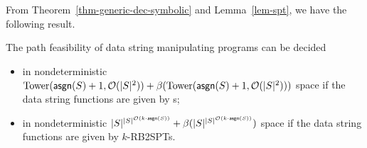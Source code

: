 From Theorem~\ref{thm-generic-dec-symbolic} and Lemma~\ref{lem-spt}, we have the following result.
\begin{theorem}\label{thm-spt}
The path feasibility of data string manipulating programs can be decided 

\begin{itemize}
	\item in nondeterministic $\mathrm{Tower}(\mathsf{asgn}(S)+1, \mathcal{O}(|S|^2)) + \beta(\mathrm{Tower}(\mathsf{asgn}(S)+1, \mathcal{O}(|S|^2)))$  space if the data string functions are given by \SSPT{}s;
	
	\item  in nondeterministic $|S|^{|S|^{\mathcal{O}(k\cdot \mathsf{asgn}(S))}} + \beta(|S|^{|S|^{\mathcal{O}(k\cdot \mathsf{asgn}(S))}})$ space if the data string functions are given by $k$-RB2SPTs. %
	
\end{itemize}
%
%
\end{theorem}

